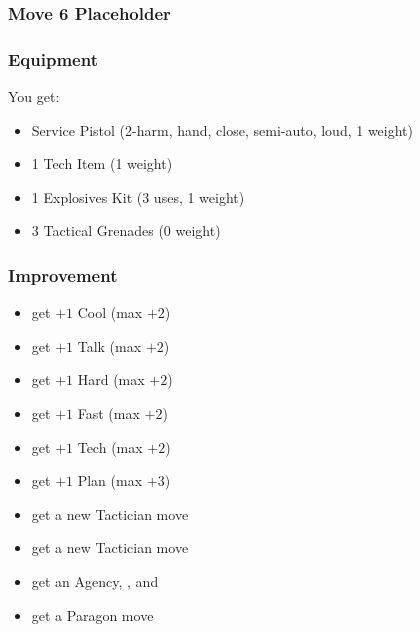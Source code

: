 
\subsubsection{Move 6 Placeholder} %

\subsubsection{Equipment}
You get:
\begin{itemize}
\item Service Pistol (2-harm, hand, close, semi-auto, loud, 1 weight) 
\item 1 Tech Item (1 weight)
\item 1 Explosives Kit (3 uses, 1 weight)
\item 3 Tactical Grenades (0 weight)
\end{itemize}

\subsubsection{Improvement}
\begin{itemize}
\item get $+1$ Cool (max $+2$)
\item get $+1$ Talk (max $+2$)
\item get $+1$ Hard (max $+2$)
\item get $+1$ Fast (max $+2$)
\item get $+1$ Tech (max $+2$)
\item get $+1$ Plan (max $+3$)
\item get a new Tactician move
\item get a new Tactician move
\item get an Agency, , and 
\item get a Paragon move
\end{itemize}
